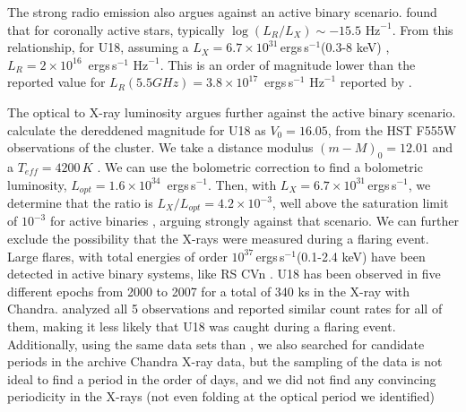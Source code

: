 \documentclass[fleqn,usenatbib,useAMS,letters]{mnras}
\newcommand{\ergs}{\,ergs\,s$^{-1}$} %
\providecommand{\DIFadd}[1]{{\protect\color{blue}\uwave{#1}}} %
\providecommand{\DIFaddbegin}{} %
\providecommand{\DIFdelbegin}{} %
\providecommand{\DIFdelend}{} %
\newcommand{\DIFscaledelfig}{0.5}
\newlength{\DIFdelgraphicswidth} %
\newlength{\DIFdelgraphicsheight} %
\newcommand{\DIFaddincludegraphics}[2][]{{\color{blue}\fbox{\DIFOincludegraphics[#1]{#2}}}} %
\newcommand{\DIFdelincludegraphics}[2][]{%
\sbox{\DIFdelgraphicsbox}{\DIFOincludegraphics[#1]{#2}}%
\settoboxwidth{\DIFdelgraphicswidth}{\DIFdelgraphicsbox} %
\settoboxtotalheight{\DIFdelgraphicsheight}{\DIFdelgraphicsbox} %
\scalebox{\DIFscaledelfig}{%
\parbox[b]{\DIFdelgraphicswidth}{\usebox{\DIFdelgraphicsbox}\\[-\baselineskip] \rule{\DIFdelgraphicswidth}{0em}}\llap{\resizebox{\DIFdelgraphicswidth}{\DIFdelgraphicsheight}{%
\setlength{\unitlength}{\DIFdelgraphicswidth}%
\begin{picture}(1,1)%
\thicklines\linethickness{2pt} %
{\color[rgb]{1,0,0}\put(0,0){\framebox(1,1){}}}%
{\color[rgb]{1,0,0}\put(0,0){\line( 1,1){1}}}%
{\color[rgb]{1,0,0}\put(0,1){\line(1,-1){1}}}%
\end{picture}%
}\hspace*{3pt}}} %
} %
\DeclareRobustCommand{\DIFaddbegin}{\DIFOaddbegin \let\includegraphics\DIFaddincludegraphics} %
\DeclareRobustCommand{\DIFdelbegin}{\DIFOdelbegin \let\includegraphics\DIFdelincludegraphics} %
\DeclareRobustCommand{\DIFdelend}{\DIFOaddend \let\includegraphics\DIFOincludegraphics} %
\begin{document}
 
 \DIFdelbegin %

\DIFdelend The strong radio emission also argues against an active binary scenario. \citet{Guedel1993} found that for coronally active stars, typically $\log(L_R/L_X) \sim -15.5 \text{ Hz}^{-1}$. From this relationship, for U18, assuming a $L_X= 6.7 \times 10 ^{31}$\ergs (0.3-8 keV) \citep{bogdanov_chandra_2010}, $L_R = 2 \times 10^{16}$ \ergs $\text{ Hz}^{-1}$. This is an order of magnitude lower than the reported value for $L_R (5.5 GHz) = 3.8\times 10^{17}$ \ergs $\text{ Hz}^{-1}$ reported by \citet{CoryPaper}. 


 
 The optical to X-ray luminosity argues further against the active binary scenario. \cite{Pallanca2017Halpha} calculate the dereddened  magnitude for U18 as $V_0 = 16.05$, from the HST F555W observations of the cluster. We take a distance modulus $(m-M)_0 = 12.01$ \citep{Gratton2003} and a $T_{eff} = 4200 \, K$ \citep{Husser2016MUSE}. We can use the \cite{Flower1996BC} bolometric correction to find a bolometric luminosity, $L_{opt} = 1.6 \times 10^{34}$ \ergs.  Then, with $L_X= 6.7 \times 10 ^{31}$\ergs \citep[0.3-8 keV;][]{bogdanov_chandra_2010}, we determine that the ratio is $L_X/L_{opt} = 4.2 \times 10^{-3}$, well above the saturation limit of $10^{-3}$ for active binaries \citep{VilhuSaturation2,VilhuSaturationLimit}, arguing strongly against that scenario. We can further exclude the possibility that the X-rays were measured during a flaring event. Large flares, with total energies of order $10^{37}$\ergs  (0.1-2.4 keV) have been detected in active binary systems, like RS CVn \citep[e.g.,][]{Kuerster1996}. U18 has been observed in five different epochs from 2000 to 2007 for a total of 340 ks in the X-ray with Chandra. \citet{bogdanov_chandra_2010} analyzed all 5 observations and reported similar count rates for all of them, making it less likely that U18 was caught during a flaring event. 
Additionally, using the same data sets than \citet{bogdanov_chandra_2010}, we also searched for candidate periods in the archive Chandra X-ray data, but the sampling of the data is not ideal to find a period in the order of days, and we did not find any convincing periodicity in the X-rays (not even folding at the optical period we identified)\DIFaddbegin \DIFadd{. 
}
\end{document}
